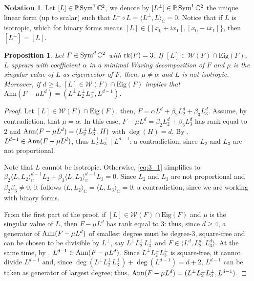 \documentclass{amsart}
\numberwithin{theorem}{section}
\newtheorem{proposition}[theorem]{Proposition}
\theoremstyle{definition}
\newtheorem{notation}[theorem]{Notation}
\newcommand{\Eig}{\mathrm{Eig}}
\newcommand{\W}{\mathcal{W}}
\newcommand{\PP}{\mathbb{P}}
\newcommand{\CC}{\mathbb{C}}
\newcommand{\rk}{\mathop{\rm rk}\nolimits}
\newcommand{\sym}{\mathop{\rm Sym}\nolimits}
\begin{document}
\begin{notation}
    Let $[L] \in\PP \sym^1\CC^2$, we denote by $[L^\perp]\in\PP\sym^1\CC^2$ the unique linear form (up to scalar) such that $L^\perp\circ L = \langle L^\perp,L \rangle_\CC=0$.
    Notice that if $L$ is isotropic, which for binary forms means $[L]\in\{[x_0+ix_1],[x_0-ix_1]\}$, then $[L^\perp]=[L]$.
\end{notation}



\begin{proposition}\label{prop:binary rank 3}
    Let $F \in \sym^d\CC^2$ with $\rk(F)=3$. If $[L] \in \W(F) \cap \Eig(F)$, $L$ appears with coefficient $\alpha$ in a minimal Waring decomposition of $F$ and $\mu$ is the singular value of $L$ as eigenvector of $F$, then, $\mu \neq \alpha$ and $L$ is not isotropic. Moreover, if $d \geq 4$, $[L] \in \W(F) \cap \Eig(F)$ implies that $\mathrm{Ann}(F-\mu L^d)=(L^\perp L_2^\perp L_3^\perp,L^{d-1})$.
\end{proposition}
\begin{proof}
    Let $[L]\in\W(F) \cap \Eig(F)$, then, $F = \alpha L^d + \beta_2L_2^d + \beta_3L_3^d$. Assume, by contradiction, that $\mu = \alpha$. In this case, $F - \mu L^d = \beta_2L_2^d + \beta_3L_3^d$ has rank equal to $2$ and ${\rm Ann}(F-\mu L^d) = (L_2^\perp L_3^\perp,H)$ with $\deg(H) = d$. By , $L^{d-1} \in {\rm Ann}(F-\mu L^d)$, thus $L_2^\perp L_3^\perp \mid L^{d-1}$: a contradiction, since $L_2$ and $L_3$ are not proportional. 
    
    Note that $L$ cannot be isotropic. Otherwise, \cref{eq:3_1} simplifies to $\beta_2\langle L,L_2 \rangle_\CC^{d-1}L_2 + \beta_3\langle L,L_3 \rangle_\CC^{d-1}L_3 = 0$. Since $L_2$ and $L_3$ are not proportional and $\beta_2\beta_3 \neq 0$, it follows $\langle L,L_2 \rangle_\CC = \langle L,L_3 \rangle_\CC = 0$: a contradiction, since we are working with binary forms. 

    From the first part of the proof, if $[L] \in \W(F) \cap \Eig(F)$ and $\mu$ is the singular value of $L$, then $F-\mu L^d$ has rank equal to $3$: thus, since $d \geq 4$, a generator of ${\rm Ann}(F-\mu L^d)$ of smallest degree must be degree-$3$, square-free and can be chosen to be divisible by $L^\perp$, say $L^\perp L_2^\perp L_3^\perp$ and $F \in \langle L^d,L_2^d,L_3^d\rangle$. At the same time, by , $L^{d-1} \in {\rm Ann}(F-\mu L^d)$. Since $L^\perp L_2^\perp L_3^\perp$ is square-free, it cannot divide $L^{d-1}$ and, since $\deg(L^\perp L_2^\perp L_3^\perp) + \deg(L^{d-1}) = d+2$, $L^{d-1}$ can be taken as generator of largest degree; thus, ${\rm Ann}(F-\mu L^d) = (L^\perp L_2^\perp L_3^\perp,L^{d-1})$. 
\end{proof}
\end{document}
